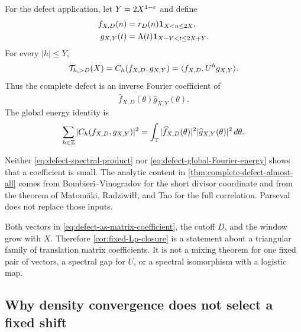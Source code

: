 For the defect application, let $Y=2X^{1-\varepsilon}$ and define
\begin{align}
 f_{X,D}(n)&=r_D(n)\mathbf 1_{X<n\le2X},
 \label{eq:defect-Fourier-sequence}\\
 g_{X,Y}(t)&=\Lambda(t)\mathbf 1_{X-Y<t\le2X+Y}.
 \label{eq:prime-Fourier-sequence}
\end{align}
For every $|h|\le Y$,
\begin{equation}\label{eq:defect-as-matrix-coefficient}
 \mathcal T_{h,>D}(X)
 =C_h(f_{X,D},g_{X,Y})
 =\langle f_{X,D},U^h g_{X,Y}\rangle.
\end{equation}
Thus the complete defect is an inverse Fourier coefficient of
\begin{equation}\label{eq:defect-spectral-product}
 \overline{\widehat f_{X,D}(\theta)}
 \widehat g_{X,Y}(\theta).
\end{equation}
The global energy identity is
\begin{equation}\label{eq:defect-global-Fourier-energy}
 \sum_{h\in\mathbb Z}|C_h(f_{X,D},g_{X,Y})|^2
 =\int_{\mathbb T}|\widehat f_{X,D}(\theta)|^2
             |\widehat g_{X,Y}(\theta)|^2\,d\theta.
\end{equation}

\begin{remark}
Neither \eqref{eq:defect-spectral-product} nor
\eqref{eq:defect-global-Fourier-energy} shows that a coefficient is small.
The analytic content in \cref{thm:complete-defect-almost-all} comes from
Bombieri--Vinogradov for the short divisor coordinate and from the theorem
of Matom\"aki, Radziwi\l\l, and Tao for the full correlation.  Parseval does
not replace those inputs.
\end{remark}

\begin{remark}
Both vectors in \eqref{eq:defect-as-matrix-coefficient}, the cutoff $D$, and
the window grow with $X$.  Therefore
\cref{cor:fixed-Lp-closure} is a statement about a triangular family of
translation matrix coefficients.  It is not a mixing theorem for one fixed
pair of vectors, a spectral gap for $U$, or a spectral isomorphism with a
logistic map.
\end{remark}

\subsection{Why density convergence does not select a fixed shift}
\label{subsec:density-does-not-select}

